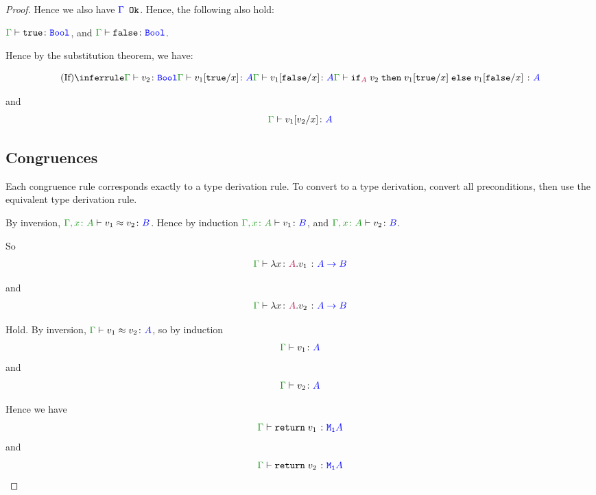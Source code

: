 \documentclass{report}
\begin{document}
\begin{framed}
\begin{proof}
            Hence we also have ${\color{blue} \Gamma} \texttt{ Ok}$. Hence, the following also hold:
        
            $\gtyperelation{\t}{\B}$, and $\gtyperelation{\f}{\B}$.
        
            Hence by the substitution theorem, we have:
        
            \begin{equation}
                \ntreeruleIII{\vif}{
                    \gtyperelation{v_2}{\B}
                }{
                    \gtyperelation{v_1\ssub{x}{\t}}{ A}
                }{
                    \gtyperelation{v_1\ssub{x}{\f}}{ A}
                }{\gtyperelation{\pifthenelse{A}{v_2}{v_1\ssub{x}{\t}}{v_1\ssub{x}{\f}}}{ A}
                }
            \end{equation}
        
            and 
            \begin{equation}
                \gtyperelation{v_1\ssub{x}{v_2}}{ A}
            \end{equation}
        
            
        
            \subsection{Congruences}
        Each congruence rule corresponds exactly to a type derivation rule. To convert to a type derivation, convert all preconditions, then use the equivalent type derivation rule.
        
        \case{\eqfun}
            By inversion, $\berelation{\gax}{v_1}{v_2}{B}$. Hence by induction $\typerelation{\gax}{v_1}{B}$, and $\typerelation{\gax}{v_2}{B}$.
        
            So 
            \begin{equation}
                \gtyperelation{\lam{x}{A}{v_1}}{\ab}
            \end{equation}
        
            and
            \begin{equation}
                \gtyperelation{\lam{x}{A}{v_2}}{\ab}
            \end{equation}
        
            Hold.
        \case{\eqreturn}
            By inversion, $\gberelation{v_1}{v_2}{A}$, so by induction $$\gtyperelation{v_1}{A}$$ and $$\gtyperelation{v_2}{A}$$
        
            Hence we have $$\gtyperelation{\return{v_1}}{\moa}$$
            and
            $$\gtyperelation{\return{v_2}}{\moa}$$
        \case{\eqapply}
        

\end{proof}
\end{framed}
\end{document}
